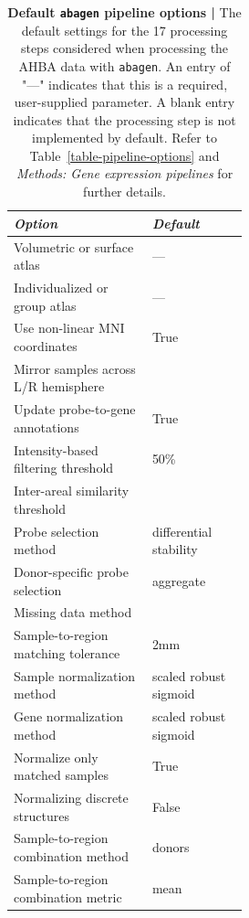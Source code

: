 \documentclass[12pt,aps,pra,reprint,showkeys]{revtex4-1}
\begin{document}
\begin{table}[htp]
    \caption{
      \textbf{Default \texttt{abagen} pipeline options | }
      The default settings for the 17 processing steps considered when processing the AHBA data with \texttt{abagen}.
      An entry of "---" indicates that this is a required, user-supplied parameter.
      A blank entry indicates that the processing step is not implemented by default.
      Refer to Table~\ref{table-pipeline-options} and \textit{Methods: Gene expression pipelines} for further details.
      \vspace{-0.5\baselineskip}
    }
    \label{supp-table-default-parameters}
    \setlength{\tabcolsep}{4.5pt}
    \renewcommand{\arraystretch}{1.25}
    \begin{center}
      \begin{tabular}{p{0.34\linewidth} p{0.17\linewidth}}
                                                 \toprule
        \emph{Option}                         &         \emph{Default} \\ \midrule
        Volumetric or surface atlas           &                    --- \\
        Individualized or group atlas         &                    --- \\
        Use non-linear MNI coordinates        &                   True \\
        Mirror samples across L/R hemisphere  &                        \\
        Update probe-to-gene annotations      &                   True \\
        Intensity-based filtering threshold   &                   50\% \\
        Inter-areal similarity threshold      &                        \\
        Probe selection method                & differential stability \\
        Donor-specific probe selection        &              aggregate \\
        Missing data method                   &                        \\
        Sample-to-region matching tolerance   &                    2mm \\
        Sample normalization method           &  scaled robust sigmoid \\
        Gene normalization method             &  scaled robust sigmoid \\
        Normalize only matched samples        &                   True \\
        Normalizing discrete structures       &                  False \\
        Sample-to-region combination method   &                 donors \\
        Sample-to-region combination metric   &                   mean \\
      \end{tabular}
    \end{center}
\end{table}
\end{document}
